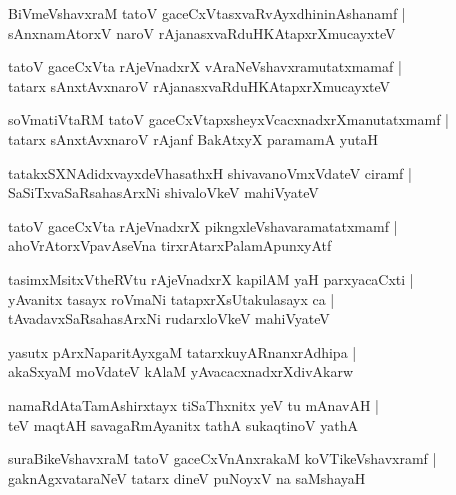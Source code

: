 \documentclass[twoside,12pt,openright]{book}
\newcounter{shloka}[chapter]
\begin{document}
\begin{shloka}
BiVmeVshavxraM tatoV gaceCxVtasxvaRvAyxdhininAshanamf |\\
sAnxnamAtorxV naroV rAjanasxvaRduHKAtapxrXmucayxteV 
\end{shloka}

\begin{shloka}
tatoV gaceCxVta rAjeVnadxrX vAraNeVshavxramutatxmamaf |\\
tatarx sAnxtAvxnaroV rAjanasxvaRduHKAtapxrXmucayxteV 
\end{shloka}

\begin{shloka}
soVmatiVtaRM tatoV gaceCxVtapxsheyxVcacxnadxrXmanutatxmamf |\\
tatarx sAnxtAvxnaroV rAjanf BakAtxyX paramamA yutaH 
\end{shloka}

\begin{shloka}
tatakxSXNAdidxvayxdeVhasathxH shivavanoVmxVdateV ciramf |\\
SaSiTxvaSaRsahasArxNi shivaloVkeV mahiVyateV 
\end{shloka}

\begin{shloka}
tatoV gaceCxVta rAjeVnadxrX pikngxleVshavaramatatxmamf |\\
ahoVrAtorxVpavAseVna tirxrAtarxPalamApunxyAtf
\end{shloka}

\begin{shloka}
tasimxMsitxVtheRVtu rAjeVnadxrX kapilAM yaH parxyacaCxti |\\
yAvanitx tasayx roVmaNi tatapxrXsUtakulasayx ca |\\
tAvadavxSaRsahasArxNi rudarxloVkeV mahiVyateV 
\end{shloka}

\begin{shloka}
yasutx pArxNaparitAyxgaM tatarxkuyARnanxrAdhipa |\\
akaSxyaM moVdateV kAlaM yAvacacxnadxrXdivAkarw
\end{shloka}

\begin{shloka}
namaRdAtaTamAshirxtayx tiSaThxnitx yeV tu mAnavAH |\\
teV maqtAH savagaRmAyanitx tathA sukaqtinoV yathA 
\end{shloka}

\begin{shloka}
suraBikeVshavxraM tatoV gaceCxVnAnxrakaM koVTikeVshavxramf |\\
gaknAgxvataraNeV tatarx dineV puNoyxV na saMshayaH 
\end{shloka}
\end{document}
